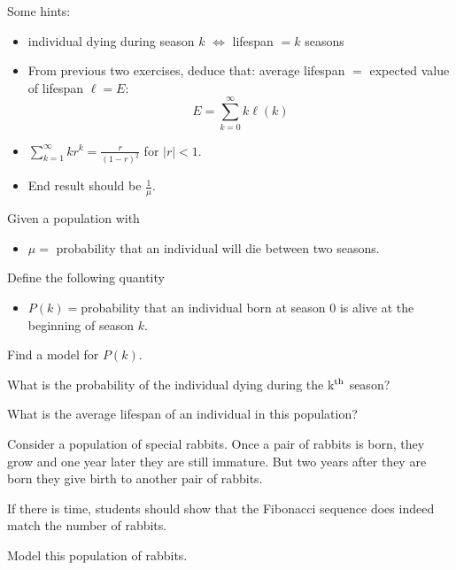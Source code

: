 \begin{annotation}
\begin{goals}
	Some hints:
	\begin{itemize}
		\item individual dying during season $k$ $\Leftrightarrow$ lifespan $= k$ seasons
		\item From previous two exercises, deduce that: average lifespan $=$ expected value of lifespan $\ell = E$:
		$$ E = \sum_{k=0}^\infty k \ell(k) $$
		\item $\displaystyle \sum_{k=1}^\infty k r^k = \frac{r}{(1-r)^2}$ for $|r|<1$.
		\item End result should be $\frac1\mu$.
\end{itemize}	
\end{goals}
\end{annotation}
\question
	Given a population with
	\begin{itemize}
		\item $\mu=$ probability that an individual will die between two seasons.
	\end{itemize}
\begin{parts}
	\item Define the following quantity
	\begin{itemize}
		\item $P(k)=$probability that an individual born at season $0$ is alive at the beginning of season $k$.
	\end{itemize}
	Find a model for $P(k)$.

	\item What is the probability of the individual dying during the k$^{\rm th}$ season?
	\item What is the average lifespan of an individual in this population?
\end{parts}




\bookonlynewpage


\question
	Consider a population of special rabbits. Once a pair of rabbits is born, they grow and one year later they are still immature. But two years after they are born they give birth to another pair of rabbits.
	
\begin{annotation}
	\begin{goals}
		If there is time, students should show that the Fibonacci sequence does indeed match the number of rabbits.
	\end{goals}
\end{annotation}
	Model this population of rabbits.	

